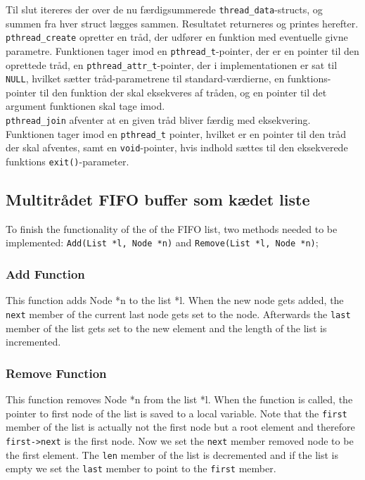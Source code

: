 Til slut itereres der over de nu færdigsummerede \texttt{thread\_data}-structs, og summen fra hver struct lægges sammen. Resultatet returneres og printes herefter. \\ 

\texttt{pthread\_create} opretter en tråd, der udfører en funktion med eventuelle givne parametre. 
Funktionen tager imod en \texttt{pthread\_t}-pointer, der er en pointer til den oprettede tråd, en \texttt{pthread\_attr\_t}-pointer, der i implementationen er sat til \texttt{NULL}, hvilket sætter tråd-parametrene til standard-værdierne, en funktions-pointer til den funktion der skal eksekveres af tråden, og en pointer til det argument funktionen skal tage imod. \\

\texttt{pthread\_join} afventer at en given tråd bliver færdig med eksekvering. 
Funktionen tager imod en \texttt{pthread\_t} pointer, hvilket er en pointer til den tråd der skal afventes, samt en \texttt{void}-pointer, hvis indhold sættes til den eksekverede funktions \texttt{exit()}-parameter.\\

\subsection{Multitrådet FIFO buffer som kædet liste}
\label{list.c}
To finish the functionality of the of the FIFO list, two methods needed to be implemented: \texttt{Add(List *l, Node *n)} and \texttt{Remove(List *l, Node *n)};
\subsubsection{Add Function}
This function adds Node *n to the list *l. When the new node gets added, the \texttt{next} member of the current last node gets set to the node. Afterwards the \texttt{last} member of the list gets set to the new element and the length of the list is incremented. 
\subsubsection{Remove Function}
This function removes Node *n from the list *l. When the function is called, the pointer to first node of the list is saved to a local variable. Note that the \texttt{first} member of the list is actually not the first node but a root element and therefore \texttt{first->next} is the first node. Now we set the \texttt{next} member removed node to be the first element. The \texttt{len} member of the list is decremented and if the list is empty we set the \texttt{last} member to point to the \texttt{first} member.\\

